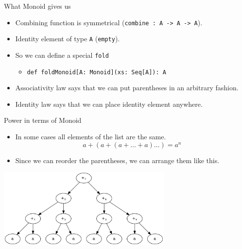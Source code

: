 \documentclass[presentation,aspectratio=169,smaller]{beamer}
\begin{document}
\begin{frame}[label={sec:org99163b4},fragile]{What Monoid gives us}
 \begin{itemize}
\item Combining function is symmetrical (\texttt{combine : A -> A -> A}).
\end{itemize}
\pause
\begin{itemize}
\item Identity element of type \texttt{A} (\texttt{empty}).
\end{itemize}
\pause
\begin{itemize}
\item So we can define a special \texttt{fold}
\begin{itemize}
\item \texttt{def foldMonoid[A: Monoid](xs: Seq[A]): A}
\end{itemize}
\end{itemize}
\pause
\begin{itemize}
\item Associativity law says that we can put parentheses in an arbitrary fashion.
\end{itemize}
\pause
\begin{itemize}
\item Identity law says that we can place identity element anywhere.
\end{itemize}
\end{frame}

\begin{frame}[label={sec:org32c1a10}]{Power in terms of Monoid}
\begin{itemize}
\item In some cases all elements of the list are the same.
\pause
\begin{equation*}
  a + (a + (a + \ldots + a) \ldots ) = a ^ n
\end{equation*}
\end{itemize}

\pause

\begin{itemize}
\item Since we can reorder the parentheses, we can arrange them like this.
\end{itemize}

\pause
\begin{center}
\includegraphics[height=4cm]{.dot/fold-power-1.png}
\end{center}
\end{frame}
\end{document}
